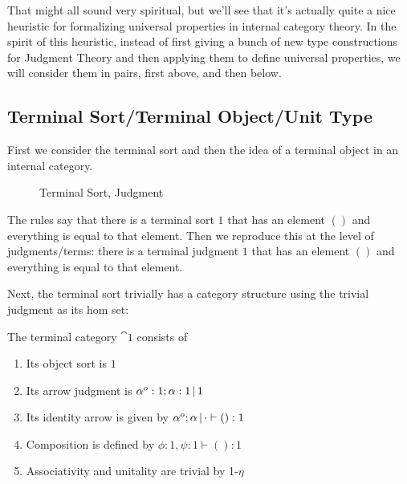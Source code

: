 \documentclass{article}
\begin{document}
That might all sound very spiritual, but we'll see that it's actually
quite a nice heuristic for formalizing universal properties in
internal category theory.
In the spirit of this heuristic, instead of first giving a bunch of
new type constructions for Judgment Theory and then applying them to
define universal properties, we will consider them in pairs, first
above, and then below.

\subsection{Terminal Sort/Terminal Object/Unit Type}

First we consider the terminal sort and then the idea of a terminal
object in an internal category.

\begin{figure}
  \caption{Terminal Sort, Judgment}
\end{figure}

The rules say that there is a terminal sort $1$ that has an element
$()$ and everything is equal to that element.
Then we reproduce this at the level of judgments/terms: there is a
terminal judgment $1$ that has an element $()$ and everything is equal
to that element.

Next, the terminal sort trivially has a category structure using the
trivial judgment as its hom set:

\begin{definition}
  The terminal category $\cat 1$ consists of
  \begin{enumerate}
  \item Its object sort is $1$
  \item Its arrow judgment is $\alpha^o:1;\alpha:1 \,|\, 1$
  \item Its identity arrow is given by $\alpha^o;\alpha \,|\, \cdot \vdash () : 1$
  \item Composition is defined by $\phi : 1, \psi : 1 \vdash () : 1$
  \item Associativity and unitality are trivial by \textsc{1-$\eta$}
  \end{enumerate}
\end{definition}
\end{document}
